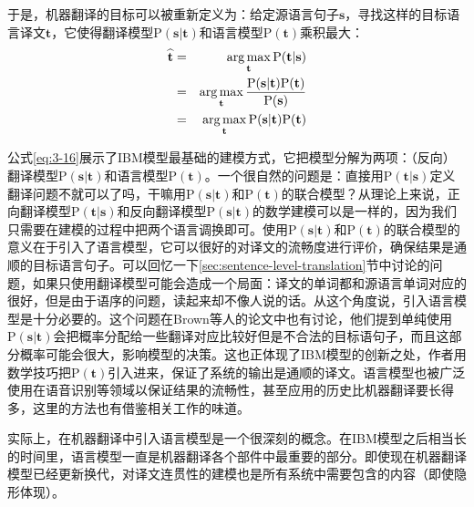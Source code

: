 于是，机器翻译的目标可以被重新定义为：给定源语言句子$\mathbf{s}$，寻找这样的目标语言译文$\mathbf{t}$，它使得翻译模型$\textrm{P}(\mathbf{s}|\mathbf{t})$和语言模型$\textrm{P}(\mathbf{t})$乘积最大：
\begin{eqnarray}
\widehat{\mathbf{t}} & = & \operatorname*{arg\,max}_{\mathbf{t}} \textrm{P}(\mathbf{t}|\mathbf{s}) \nonumber \\
          & = & \operatorname*{arg\,max}_{\mathbf{t}} \frac{\textrm{P}(\mathbf{s}|\mathbf{t})\textrm{P}(\mathbf{t})}{\textrm{P}(\mathbf{s})} \nonumber \\
          & = & \operatorname*{arg\,max}_{\mathbf{t}} \textrm{P}(\mathbf{s}|\mathbf{t})\textrm{P}(\mathbf{t})
\label{eq:3-16}
\end{eqnarray}

\parinterval 公式\ref{eq:3-16}展示了IBM模型最基础的建模方式，它把模型分解为两项：（反向）翻译模型$\textrm{P}(\mathbf{s}|\mathbf{t})$和语言模型$\textrm{P}(\mathbf{t})$。一个很自然的问题是：直接用$\textrm{P}(\mathbf{t}|\mathbf{s})$定义翻译问题不就可以了吗，干嘛用$\textrm{P}(\mathbf{s}|\mathbf{t})$和$\textrm{P}(\mathbf{t})$的联合模型？从理论上来说，正向翻译模型$\textrm{P}(\mathbf{t}|\mathbf{s})$和反向翻译模型$\textrm{P}(\mathbf{s}|\mathbf{t})$的数学建模可以是一样的，因为我们只需要在建模的过程中把两个语言调换即可。使用$\textrm{P}(\mathbf{s}|\mathbf{t})$和$\textrm{P}(\mathbf{t})$的联合模型的意义在于引入了语言模型，它可以很好的对译文的流畅度进行评价，确保结果是通顺的目标语言句子。可以回忆一下\ref{sec:sentence-level-translation}节中讨论的问题，如果只使用翻译模型可能会造成一个局面：译文的单词都和源语言单词对应的很好，但是由于语序的问题，读起来却不像人说的话。从这个角度说，引入语言模型是十分必要的。这个问题在Brown等人的论文中也有讨论\cite{brown1990statistical}，他们提到单纯使用$\textrm{P}(\mathbf{s}|\mathbf{t})$会把概率分配给一些翻译对应比较好但是不合法的目标语句子，而且这部分概率可能会很大，影响模型的决策。这也正体现了IBM模型的创新之处，作者用数学技巧把$\textrm{P}(\mathbf{t})$引入进来，保证了系统的输出是通顺的译文。语言模型也被广泛使用在语音识别等领域以保证结果的流畅性，甚至应用的历史比机器翻译要长得多，这里的方法也有借鉴相关工作的味道。

实际上，在机器翻译中引入语言模型是一个很深刻的概念。在IBM模型之后相当长的时间里，语言模型一直是机器翻译各个部件中最重要的部分。即使现在机器翻译模型已经更新换代，对译文连贯性的建模也是所有系统中需要包含的内容（即使隐形体现）。


